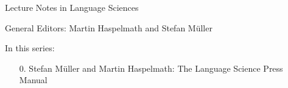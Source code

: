 
{\large Lecture Notes in Language Sciences}

\bigskip

General Editors: Martin Haspelmath and Stefan Müller

\bigskip

In this series:

\begin{enumerate}
\item[0.]\setcounter{enumi}{0} Stefan Müller and Martin Haspelmath: The Language Science Press Manual
\end{enumerate}
